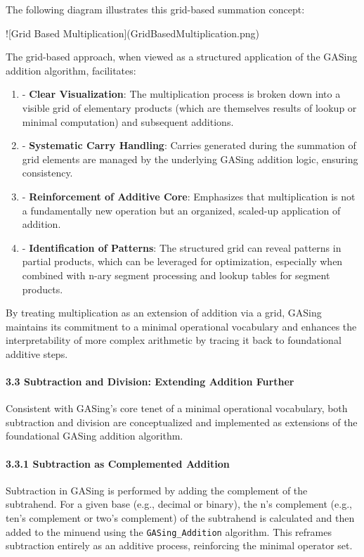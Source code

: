 \documentclass[11pt,a4paper]{article}
\begin{document}
The following diagram illustrates this grid-based summation concept:

![Grid Based Multiplication](GridBasedMultiplication.png)

The grid-based approach, when viewed as a structured application of the GASing addition algorithm, facilitates:

\begin{enumerate}
  \item - \textbf{Clear Visualization}: The multiplication process is broken down into a visible grid of elementary products (which are themselves results of lookup or minimal computation) and subsequent additions.
  \item - \textbf{Systematic Carry Handling}: Carries generated during the summation of grid elements are managed by the underlying GASing addition logic, ensuring consistency.
  \item - \textbf{Reinforcement of Additive Core}: Emphasizes that multiplication is not a fundamentally new operation but an organized, scaled-up application of addition.
  \item - \textbf{Identification of Patterns}: The structured grid can reveal patterns in partial products, which can be leveraged for optimization, especially when combined with n-ary segment processing and lookup tables for segment products.
\end{enumerate}

By treating multiplication as an extension of addition via a grid, GASing maintains its commitment to a minimal operational vocabulary and enhances the interpretability of more complex arithmetic by tracing it back to foundational additive steps.

\paragraph{3.3 Subtraction and Division: Extending Addition Further}
Consistent with GASing's core tenet of a minimal operational vocabulary, both subtraction and division are conceptualized and implemented as extensions of the foundational GASing addition algorithm.

\paragraph{3.3.1 Subtraction as Complemented Addition}
Subtraction in GASing is performed by adding the complement of the subtrahend. For a given base (e.g., decimal or binary), the n's complement (e.g., ten's complement or two's complement) of the subtrahend is calculated and then added to the minuend using the \texttt{GASing_Addition} algorithm. This reframes subtraction entirely as an additive process, reinforcing the minimal operator set.
\end{document}
